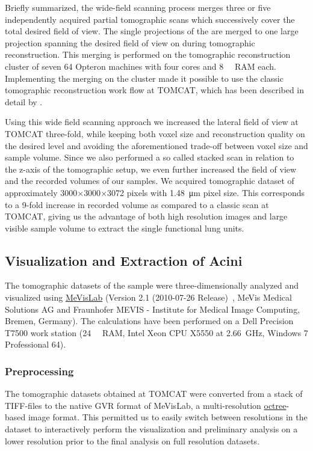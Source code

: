 \documentclass[%
	paper=a4,%
	DIV=calc,%
	twoside=true,%
	abstract=true,%
	]{scrartcl}
\begin{document}
Briefly summarized, the wide-field scanning process merges three or five independently acquired partial tomographic scans which successively cover the total desired field of view. The single projections of the are merged to one large projection spanning the desired field of view on during tomographic reconstruction. This merging is performed on the tomographic reconstruction cluster of seven \SI{64}{\bit} Opteron machines with four cores and \SI{8}{\giga\byte} RAM each. Implementing the merging on the cluster made it possible to use the classic tomographic reconstruction work flow at TOMCAT, which has been described in detail by \citet{Hintermueller2010}.

Using this wide field scanning approach we increased the lateral field of view at TOMCAT three-fold, while keeping both voxel size and reconstruction quality on the desired level and avoiding the aforementioned trade-off between voxel size and sample volume. Since we also performed a so called stacked scan in relation to the z-axis of the tomographic setup, we even further increased the field of view and the recorded volumes of our samples. We acquired tomographic dataset of approximately 3000\(\times\)3000\(\times\)3072 pixels with \SI{1.48}{\micro\meter} pixel size. This corresponds to a 9-fold increase in recorded volume as compared to a classic scan at TOMCAT, giving us the advantage of both high resolution images and large visible sample volume to extract the single functional lung units.

\subsection{Visualization and Extraction of Acini}
The tomographic datasets of the sample were three-dimensionally analyzed and visualized using \href{http://mevislab.de}{MeVisLab} (Version 2.1 (2010-07-26 Release)~\cite{Bitter2007}, MeVis Medical Solutions AG and Fraunhofer MEVIS - Institute for Medical Image Computing, Bremen, Germany). The calculations have been performed on a Dell Precision T7500 work station (\SI{24}{\giga\byte} RAM, Intel Xeon CPU X5550 at \SI{2.66}{\giga\hertz}, Windows 7 Professional \SI{64}{\bit}).

\subsubsection{Preprocessing}
The tomographic datasets obtained at TOMCAT were converted from a stack of TIFF-files to the native GVR format of MeVisLab, a multi-resolution \href{https://secure.wikimedia.org/wikipedia/en/w/index.php?title=Octree&oldid=409131920}{octree}-based image format. This permitted us to easily switch between resolutions in the dataset to interactively perform the visualization and preliminary analysis on a lower resolution prior to the final analysis on full resolution datasets.
\end{document}
